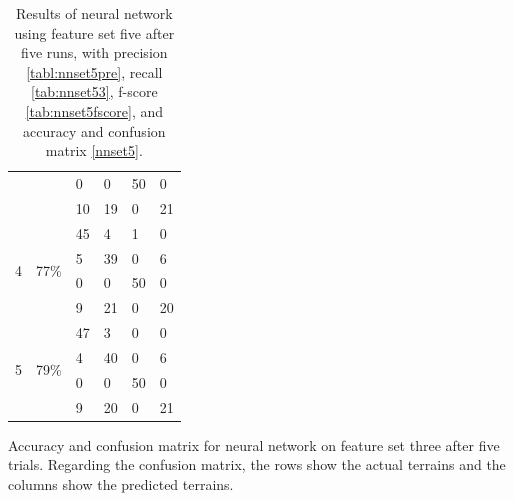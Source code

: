 \documentclass[USenglish]{ifimaster}  %
\begin{document}
\begin{table}[h]
\begin{subtable}[h]{1\textwidth}
\begin{tabular}{@{}llllll@{}}
			\multicolumn{1}{l|}{} & \multicolumn{1}{l|}{} & \multicolumn{1}{l|}{0} & \multicolumn{1}{l|}{0} & \multicolumn{1}{l|}{50} & 0 \\ \cmidrule(l){3-6} 
			\multicolumn{1}{l|}{} & \multicolumn{1}{l|}{} & \multicolumn{1}{l|}{10} & \multicolumn{1}{l|}{19} & \multicolumn{1}{l|}{0} & 21 \\ \midrule
			\multicolumn{1}{l|}{\multirow{4}{*}{4}} & \multicolumn{1}{l|}{\multirow{4}{*}{77\%}} & \multicolumn{1}{l|}{45} & \multicolumn{1}{l|}{4} & \multicolumn{1}{l|}{1} & 0 \\ \cmidrule(l){3-6} 
			\multicolumn{1}{l|}{} & \multicolumn{1}{l|}{} & \multicolumn{1}{l|}{5} & \multicolumn{1}{l|}{39} & \multicolumn{1}{l|}{0} & 6 \\ \cmidrule(l){3-6} 
			\multicolumn{1}{l|}{} & \multicolumn{1}{l|}{} & \multicolumn{1}{l|}{0} & \multicolumn{1}{l|}{0} & \multicolumn{1}{l|}{50} & 0 \\ \cmidrule(l){3-6} 
			\multicolumn{1}{l|}{} & \multicolumn{1}{l|}{} & \multicolumn{1}{l|}{9} & \multicolumn{1}{l|}{21} & \multicolumn{1}{l|}{0} & 20 \\ \midrule
			\multicolumn{1}{l|}{\multirow{4}{*}{5}} & \multicolumn{1}{l|}{\multirow{4}{*}{79\%}} & \multicolumn{1}{l|}{47} & \multicolumn{1}{l|}{3} & \multicolumn{1}{l|}{0} & 0 \\ \cmidrule(l){3-6} 
			\multicolumn{1}{l|}{} & \multicolumn{1}{l|}{} & \multicolumn{1}{l|}{4} & \multicolumn{1}{l|}{40} & \multicolumn{1}{l|}{0} & 6 \\ \cmidrule(l){3-6} 
			\multicolumn{1}{l|}{} & \multicolumn{1}{l|}{} & \multicolumn{1}{l|}{0} & \multicolumn{1}{l|}{0} & \multicolumn{1}{l|}{50} & 0 \\ \cmidrule(l){3-6} 
			\multicolumn{1}{l|}{} & \multicolumn{1}{l|}{} & \multicolumn{1}{l|}{9} & \multicolumn{1}{l|}{20} & \multicolumn{1}{l|}{0} & 21 \\ \bottomrule
		\end{tabular}
		\caption{Accuracy and confusion matrix for neural network on feature set three after five trials. Regarding the confusion matrix, the rows show the actual terrains and the columns show the predicted terrains.}
		\label{nnset5}
	\end{subtable}
\caption[Results of Neural network on feature set five]{Results of neural network using feature set five after five runs, with precision \ref{tabl:nnset5pre}, recall \ref{tab:nnset53}, f-score \ref{tab:nnset5fscore}, and accuracy and confusion matrix \ref{nnset5}.}
\label{tab:binary2}
\end{table}
\FloatBarrier
\newpage
	
\end{document}
